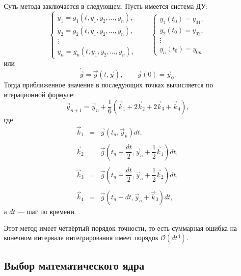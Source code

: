 Суть метода заключается в следующем. Пусть имеется система ДУ:
\begin{equation*}
	\begin{cases}
		\dot{y}_1 = g_1 (t,y_1,y_2,\dots,y_n), \\
		\dot{y}_2 = g_2 (t,y_1,y_2,\dots,y_n), \\
		\vdots \\
		\dot{y}_n = g_n (t,y_1,y_2,\dots,y_n), 
	\end{cases}
	\qquad 
	\begin{cases}
		y_1 (t_0) = y_{01}, \\
		y_2 (t_0) = y_{02}, \\
		\vdots \\
		y_n (t_0) = y_{0n} 
	\end{cases}
\end{equation*}
или
\begin{equation*}
\dot{\vec{y}} = \vec{g} \left(t , \vec{y}\right), \qquad \vec{y}(0) = \vec{y}_0.
\end{equation*}
Тогда приближенное значение в последующих точках вычисляется по итерационной формуле:
\begin{equation}
\vec{y}_{n+1} = \vec{y}_n + \frac{1}{6} \left( \vec{k}_1 + 2 \vec{k}_2 + 2 \vec{k}_3 + \vec{k}_4  \right),
\end{equation}
где 
\begin{eqnarray}
\vec{k}_1 &=& \vec{g}(t_n,\vec{y}_n) dt, \nonumber \\ \nonumber \\
\vec{k}_2 &=& \vec{g}(t_n + \dfrac{dt}{2},\vec{y}_n + \dfrac{1}{2} \vec{k}_1 ) dt, \nonumber \\  \\
\vec{k}_3 &=& \vec{g}(t_n + \dfrac{dt}{2},\vec{y}_n + \dfrac{1}{2} \vec{k}_2 ) dt, \nonumber \\ \nonumber \\
\vec{k}_4 &=& \vec{g}(t_n + dt,\vec{y}_n + \vec{k}_3) dt, \nonumber
\end{eqnarray}
а $dt$ --- шаг по времени.

Этот метод имеет четвёртый порядок точности, то есть суммарная ошибка на конечном интервале интегрирования имеет порядок $\mathscr{O}(d t^4)$.



\subsection{Выбор математического ядра}

